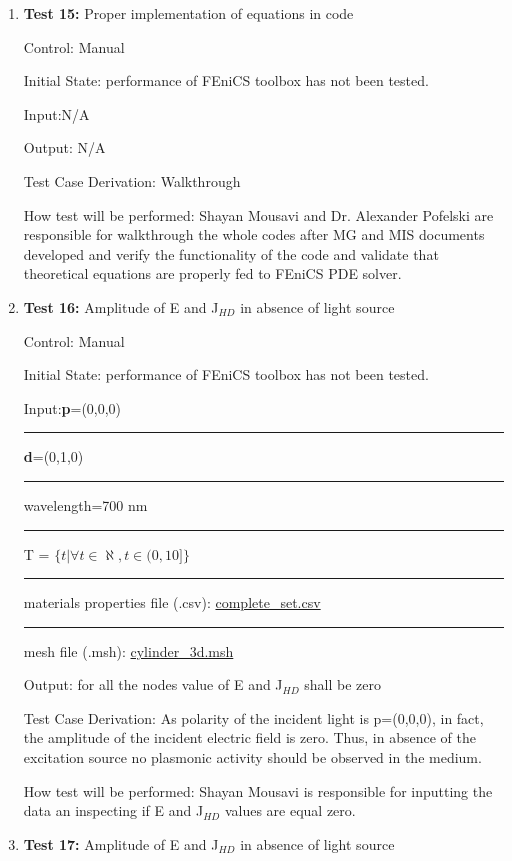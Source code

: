 \documentclass[12pt, titlepage]{article}
\begin{document}
\begin{enumerate}
	
\item{\textbf{Test 15:} Proper implementation of equations in code\\}

Control: Manual

Initial State:  performance of FEniCS toolbox has not been tested. 

Input:N/A

Output: N/A

Test Case Derivation: Walkthrough 

How test will be performed: Shayan Mousavi and Dr. Alexander Pofelski are responsible for walkthrough the whole codes after MG and MIS documents developed and verify the functionality of the code and validate that theoretical equations are properly fed to FEniCS PDE solver.
\\	
\item{\textbf{Test 16:} Amplitude of E and J$_{HD}$ in absence of light source\\}

Control: Manual 

Initial State:  performance of FEniCS toolbox has not been tested. 

Input:\textbf{p}=(0,0,0)\\
\rule{1.3cm}{0pt}\textbf{d}=(0,1,0)\\
\rule{1.3cm}{0pt}wavelength=700 nm\\ 
\rule{1.3cm}{0pt}T = $\{t| \forall t \in \aleph, t \in (0,10]\}$\\
\rule{1.3cm}{0pt}materials properties file (.csv): \href{https://github.com/shmouses/SPDFM/blob/master/src/TestCase/complete\_set.csv}{complete\_set.csv}\\
\rule{1.3cm}{0pt}mesh file (.msh): \href{https://github.com/shmouses/SPDFM/blob/master/src/TestCase/cylinder\_3d.msh}{cylinder\_3d.msh}

Output: for all the nodes value of E and J$_{HD}$ shall be zero 

Test Case Derivation: As polarity of the incident light is p=(0,0,0), in fact, the amplitude of the incident electric field is zero. Thus, in absence of the excitation source no plasmonic activity should be observed in the medium. 

How test will be performed: Shayan Mousavi is responsible for inputting the data an inspecting if E and J$_{HD}$ values are equal zero.  			
\\
\item{\textbf{Test 17:} Amplitude of E and J$_{HD}$ in absence of light source\\}


\end{enumerate}
\end{document}
